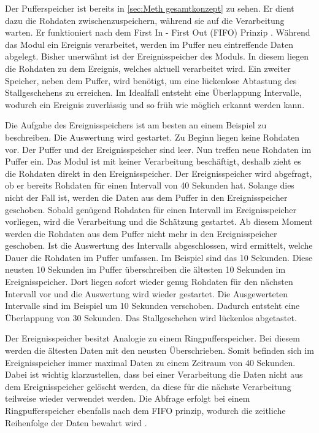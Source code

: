 Der Pufferspeicher ist bereits in \ref{sec:Meth gesamtkonzept} zu sehen. Er dient dazu die Rohdaten zwischenzuspeichern, während sie auf die Verarbeitung warten. Er funktioniert nach dem First In - First Out (\acrshort{FIFO}) Prinzip \cite{Sedgewick.2011}. Während das Modul ein Ereignis verarbeitet, werden im Puffer neu eintreffende Daten abgelegt. Bisher unerwähnt ist der Ereignisspeicher des Moduls. In diesem liegen die Rohdaten zu dem Ereignis, welches aktuell verarbeitet wird. Ein zweiter Speicher, neben dem Puffer, wird benötigt, um eine lückenlose Abtastung des Stallgeschehens zu erreichen. Im Idealfall entsteht eine Überlappung Intervalle, wodurch ein Ereignis zuverlässig und so früh wie möglich erkannt werden kann. \par

Die Aufgabe des Ereignisspeichers ist am besten an einem Beispiel zu beschreiben. Die Auswertung wird gestartet. Zu Beginn liegen keine Rohdaten vor. Der Puffer und der Ereignisspeicher sind leer. Nun treffen neue Rohdaten im Puffer ein. Das Modul ist mit keiner Verarbeitung beschäftigt, deshalb zieht es die Rohdaten direkt in den Ereignisspeicher. Der Ereignisspeicher wird abgefragt, ob er bereits Rohdaten für einen Intervall von 40 Sekunden hat. Solange dies nicht der Fall ist, werden die Daten aus dem Puffer in den Ereignisspeicher geschoben. Sobald genügend Rohdaten für einen Intervall im Ereignisspeicher vorliegen, wird die Verarbeitung und die Schätzung gestartet. Ab diesem Moment werden die Rohdaten aus dem Puffer nicht mehr in den Ereignisspeicher geschoben. Ist die Auswertung des Intervalls abgeschlossen, wird ermittelt, welche Dauer die Rohdaten im Puffer umfassen. Im Beispiel sind das 10 Sekunden. Diese neusten 10 Sekunden im Puffer überschreiben die ältesten 10 Sekunden im Ereignisspeicher. Dort liegen sofort wieder genug Rohdaten für den nächsten Intervall vor und die Auswertung wird wieder gestartet. Die Ausgewerteten Intervalle sind im Beispiel um 10 Sekunden verschoben. Dadurch entsteht eine Überlappung von 30 Sekunden. Das Stallgeschehen wird lückenlos abgetastet. \par

Der Ereignisspeicher besitzt Analogie zu einem Ringpufferspeicher. Bei diesem werden die ältesten Daten mit den neusten Überschrieben. Somit befinden sich im Ereignisspeicher immer maximal Daten zu einem Zeitraum von 40 Sekunden. Dabei ist wichtig klarzustellen, dass bei einer Verarbeitung die Daten nicht aus dem Ereignisspeicher gelöscht werden, da diese für die nächste Verarbeitung teilweise wieder verwendet werden. Die Abfrage erfolgt bei einem Ringpufferspeicher ebenfalls nach dem \acrshort{FIFO} prinzip, wodurch die zeitliche Reihenfolge der Daten bewahrt wird \cite{Sedgewick.2011}.\par

